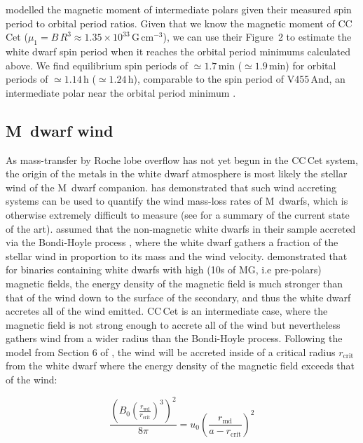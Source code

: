 \documentclass[fleqn,usenatbib]{mnras}
\begin{document}
\citet{nortonetal04-1} modelled the magnetic moment of intermediate polars given their measured  spin period to orbital period ratios. Given that we know the magnetic moment of CC\,Cet ($\mu_1 = B\,R^3 \approx1.35\times10^{33}$\,G\,cm$^{-3}$), we can use their Figure~2 to estimate the white dwarf spin period when it reaches the orbital period minimums calculated above. We find equilibrium spin periods of $\simeq1.7$\,min ($\simeq1.9$\,min) for orbital periods of $\simeq1.14$\,h ($\simeq1.24$\,h),  comparable to the spin period of V455\,And, an intermediate polar near the orbital period minimum \citep{araujo-betancoretal05-1, bloemenetal13-1}.



\subsection{M~dwarf wind}
\label{s:wind}

As mass-transfer by Roche lobe overflow has not yet begun in the CC\,Cet system, the origin of the metals in the white dwarf atmosphere is most likely the stellar wind of the M~dwarf companion. \citet{debes06-1} has demonstrated that such wind accreting systems can be used to quantify the wind mass-loss rates of M~dwarfs, which is otherwise extremely difficult to measure (see \citealt{woodetal21-1} for a summary of the current state of the art). \citet{debes06-1} assumed that the non-magnetic white dwarfs in their sample accreted via the Bondi-Hoyle process \citep{bondi+hoyle44-1}, where the white dwarf gathers a fraction of the stellar wind in proportion to its mass and the wind velocity. \citet{webbink+wickramasinghe05-1} demonstrated that for binaries containing white dwarfs with high (10s of MG, i.e pre-polars) magnetic fields, the energy density of the magnetic field is much stronger than that of the wind down to the surface of the secondary, and thus the white dwarf accretes all of the wind emitted. CC\,Cet is an intermediate case, where the magnetic field is not strong enough to accrete all of the wind but nevertheless gathers wind from a wider radius than the Bondi-Hoyle process. Following the model from Section 6 of \citet{webbink+wickramasinghe05-1}, the wind will be accreted inside of a critical radius $r_{\mathrm{crit}}$ from the white dwarf where the energy density of the magnetic field  exceeds that of the wind:

\newcommand{\D}{\displaystyle}
\begin{equation}
    \label{eqn: rcrit}
\frac{\left(B_0 \left(\frac{\D r_{\mathrm{wd}}}{\D r_{\mathrm{crit}}}\right)^3\right)^2}{8\pi} = u_0\left(\frac{r_{\mathrm{md}}}{a-r_{\mathrm{crit}}}\right)^2 
\end{equation}
\end{document}
